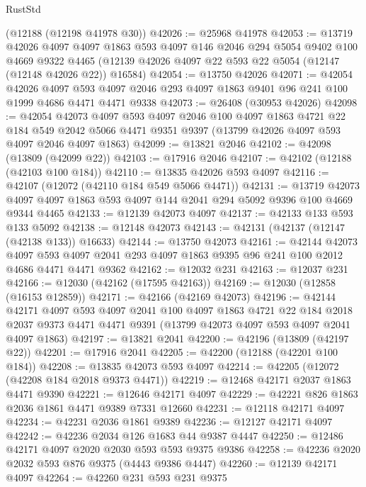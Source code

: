 \begin{lexlean}{RustStd}
\begin{coremodule}
    (@12188 (@12198 @41978 @30))
@42026 := @25968 @41978
@42053 := @13719
    @42026
    @4097
    @4097
    @1863
    @593
    @4097
    @146
    @2046
    @294
    @5054
    @9402
    @100
    @4669
    @9322
    @4465
    (@12139 @42026 @4097 @22 @593 @22 @5054 (@12147 (@12148 @42026 @22)) @16584)
@42054 := @13750 @42026
@42071 := @42054
    @42026
    @4097
    @593
    @4097
    @2046
    @293
    @4097
    @1863
    @9401
    @96
    @241
    @100
    @1999
    @4686
    @4471
    @4471
    @9338
@42073 := @26408 (@30953 @42026)
@42098 := @42054
    @42073
    @4097
    @593
    @4097
    @2046
    @100
    @4097
    @1863
    @4721
    @22
    @184
    @549
    @2042
    @5066
    @4471
    @9351
    @9397
    (@13799 @42026 @4097 @593 @4097 @2046 @4097 @1863)
@42099 := @13821 @2046
@42102 := @42098 (@13809 (@42099 @22))
@42103 := @17916 @2046
@42107 := @42102 (@12188 (@42103 @100 @184))
@42110 := @13835 @42026 @593 @4097
@42116 := @42107 (@12072 (@42110 @184 @549 @5066 @4471))
@42131 := @13719
    @42073
    @4097
    @4097
    @1863
    @593
    @4097
    @144
    @2041
    @294
    @5092
    @9396
    @100
    @4669
    @9344
    @4465
@42133 := @12139 @42073 @4097
@42137 := @42133 @133 @593 @133 @5092
@42138 := @12148 @42073
@42143 := @42131 (@42137 (@12147 (@42138 @133)) @16633)
@42144 := @13750 @42073
@42161 := @42144
    @42073
    @4097
    @593
    @4097
    @2041
    @293
    @4097
    @1863
    @9395
    @96
    @241
    @100
    @2012
    @4686
    @4471
    @4471
    @9362
@42162 := @12032 @231
@42163 := @12037 @231
@42166 := @12030 (@42162 (@17595 @42163))
@42169 := @12030 (@12858 (@16153 @12859))
@42171 := @42166 (@42169 @42073)
@42196 := @42144
    @42171
    @4097
    @593
    @4097
    @2041
    @100
    @4097
    @1863
    @4721
    @22
    @184
    @2018
    @2037
    @9373
    @4471
    @4471
    @9391
    (@13799 @42073 @4097 @593 @4097 @2041 @4097 @1863)
@42197 := @13821 @2041
@42200 := @42196 (@13809 (@42197 @22))
@42201 := @17916 @2041
@42205 := @42200 (@12188 (@42201 @100 @184))
@42208 := @13835 @42073 @593 @4097
@42214 := @42205 (@12072 (@42208 @184 @2018 @9373 @4471))
@42219 := @12468 @42171 @2037 @1863 @4471 @9390
@42221 := @12646 @42171 @4097
@42229 := @42221 @826 @1863 @2036 @1861 @4471 @9389 @7331 @12660
@42231 := @12118 @42171 @4097
@42234 := @42231 @2036 @1861 @9389
@42236 := @12127 @42171 @4097
@42242 := @42236 @2034 @126 @1683 @44 @9387 @4447
@42250 := @12486 @42171 @4097 @2020 @2030 @593 @593 @9375 @9386
@42258 := @42236 @2020 @2032 @593 @876 @9375 (@4443 @9386 @4447)
@42260 := @12139 @42171 @4097
@42264 := @42260 @231 @593 @231 @9375

\end{coremodule}
\end{lexlean}

